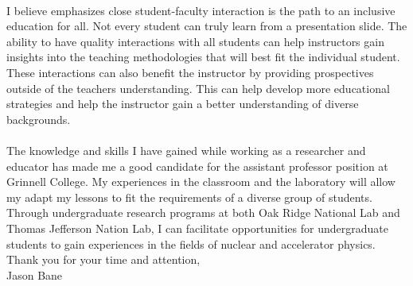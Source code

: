 \documentclass[12pt,letterpaper]{article}
\begin{document}
\paragraph{}I believe emphasizes close student-faculty interaction is the path to an inclusive education for all. Not every student can truly learn from a presentation slide. The ability to have quality interactions with all students can help instructors gain insights into the teaching methodologies that will best fit the individual student. These interactions can also benefit the instructor by providing  prospectives outside of the teachers understanding. This can help develop more educational strategies and help the instructor gain a better understanding of diverse backgrounds. 






\paragraph{}The knowledge and skills I have gained while working as a researcher and educator has made me a good candidate for the assistant professor position at 	
Grinnell College. My experiences in the classroom and the laboratory will allow my adapt my lessons to fit the requirements of a diverse group of students. Through undergraduate research programs at both Oak Ridge National Lab and Thomas Jefferson Nation Lab, I can facilitate opportunities for undergraduate students to gain experiences in the fields of nuclear and accelerator physics.  
\\

\noindent Thank you for your time and attention,\\
\noindent Jason Bane
\end{document}
